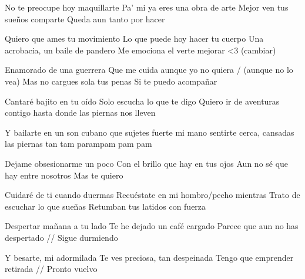 \endverse


\beginverse
    No te preocupe hoy maquillarte
    Pa' mi ya eres una obra de arte
    Mejor ven tus sueños comparte
    Queda aun tanto por hacer
\endverse

\beginverse
    Quiero que ames tu movimiento
    Lo que puede hoy hacer tu cuerpo
    Una acrobacia, un baile de pandero
    Me emociona el verte mejorar <3 (cambiar)
\endverse

\beginverse
    Enamorado de una guerrera
    Que me cuida aunque yo no quiera / (aunque no lo vea)
    Mas no cargues sola tus penas
    Si te puedo acompañar
\endverse

\beginverse
    Cantaré bajito en tu oído
    Solo escucha lo que te digo
    Quiero ir de aventuras contigo
    hasta donde las piernas nos lleven
\endverse

\beginverse
    Y bailarte en un son cubano
    que sujetes fuerte mi mano
    sentirte cerca, cansadas las piernas
    tan tam parampam pam pam
\endverse

\beginverse
    Dejame obsesionarme un poco
    Con el brillo que hay en tus ojos
    Aun no sé que hay entre nosotros
    Mas te quiero
\endverse

\beginverse
    Cuidaré de ti cuando duermas
    Recuéstate en mi hombro/pecho mientras
    Trato de escuchar lo que sueñas
    Retumban tus latidos con fuerza
\endverse

\beginverse
    Despertar mañana a tu lado
    Te he dejado un café cargado
    Parece que aun no has despertado
    // Sigue durmiendo
\endverse

\beginverse
    Y besarte, mi adormilada
    Te ves preciosa, tan despeinada
    Tengo que emprender retirada
    // Pronto vuelvo
\endverse
